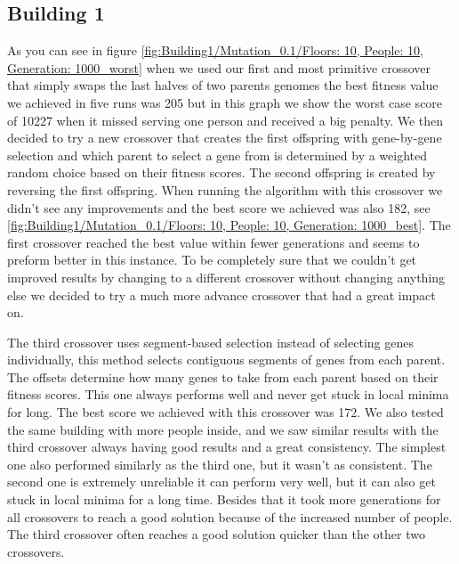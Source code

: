 \subsection{Building 1}
As you can see in figure \ref{fig:Building1/Mutation_0.1/Floors: 10, People: 10, Generation: 1000_worst} when we used our first and most primitive crossover that simply swaps the last halves of two parents genomes the best fitness value we achieved in five runs was 205 but in this graph we show the worst case score of 10227 when it missed serving one person and received a big penalty. We then decided to try a new crossover that creates the first offspring with gene-by-gene selection and which parent to select a gene from is determined by a weighted random choice based on their fitness scores. The second offspring is created by reversing the first offspring.
When running the algorithm with this crossover we didn't see any improvements and the best score we achieved was also 182, see \ref{fig:Building1/Mutation_0.1/Floors: 10, People: 10, Generation: 1000_best}. The first crossover reached the best value within fewer generations and seems to preform better in this instance. To be completely sure that we couldn't get improved results by changing to a different crossover without changing anything else we decided to try a much more advance crossover that had a great impact on. %

The third crossover uses segment-based selection instead of selecting genes individually, this method selects contiguous segments of genes from each parent. The offsets determine how many genes to take from each parent based on their fitness scores. This one always performs well and never get stuck in local minima for long. The best score we achieved with this crossover was 172. %
We also tested the same building with more people inside, and we saw similar results with the third crossover always having good results and a great consistency. The simplest one also performed similarly as the third one, but it wasn't as consistent. The second one is extremely unreliable it can perform very well, but it can also get stuck in local minima for a long time. Besides that it took more generations for all crossovers to reach a good solution because of the increased number of people. The third crossover often reaches a good solution quicker than the other two crossovers.


